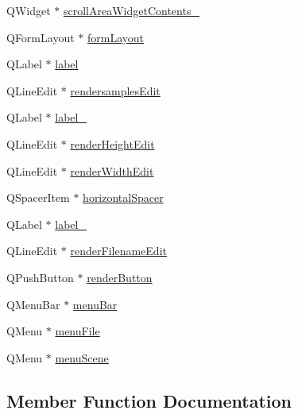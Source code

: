 \begin{DoxyCompactItemize}
Q\+Widget $\ast$ \hyperlink{classUi__MainWindow_a4e1eee0f921cc380d939163bfd5d47a3}{scroll\+Area\+Widget\+Contents\+\_}
\item 
Q\+Form\+Layout $\ast$ \hyperlink{classUi__MainWindow_afedcce3d8f3dddf4c1fd5b768660b8ee}{form\+Layout}
\item 
Q\+Label $\ast$ \hyperlink{classUi__MainWindow_ad9c89133780f28e6efa2ec17ceb9cff5}{label}
\item 
Q\+Line\+Edit $\ast$ \hyperlink{classUi__MainWindow_a4f6e5de43d5ec53629f8b24c8c04ccd4}{rendersamples\+Edit}
\item 
Q\+Label $\ast$ \hyperlink{classUi__MainWindow_a2e2516d755e4dd53fc905dabddf2738a}{label\+\_}
\item 
Q\+Line\+Edit $\ast$ \hyperlink{classUi__MainWindow_a175311edee055dc152229c85aa44aae2}{render\+Height\+Edit}
\item 
Q\+Line\+Edit $\ast$ \hyperlink{classUi__MainWindow_a03d97723a5fc40990e51477c727ef4ba}{render\+Width\+Edit}
\item 
Q\+Spacer\+Item $\ast$ \hyperlink{classUi__MainWindow_a7871ea8c4b6c595d7ccd53960b344719}{horizontal\+Spacer}
\item 
Q\+Label $\ast$ \hyperlink{classUi__MainWindow_a0376fd90247280e7c7957cc70628708c}{label\+\_}
\item 
Q\+Line\+Edit $\ast$ \hyperlink{classUi__MainWindow_af45b78bb37d033005794431a1ebb98a8}{render\+Filename\+Edit}
\item 
Q\+Push\+Button $\ast$ \hyperlink{classUi__MainWindow_a8ab000931129e9c9b0fb0f3d813cc704}{render\+Button}
\item 
Q\+Menu\+Bar $\ast$ \hyperlink{classUi__MainWindow_a2be1c24ec9adfca18e1dcc951931457f}{menu\+Bar}
\item 
Q\+Menu $\ast$ \hyperlink{classUi__MainWindow_a7ba84cb4cdd6a12dc83bf4e100bd8d80}{menu\+File}
\item 
Q\+Menu $\ast$ \hyperlink{classUi__MainWindow_a16e36cf51adc60f6bf8122c86d1c6b9d}{menu\+Scene}
\end{DoxyCompactItemize}


\subsection{Member Function Documentation}
\hypertarget{classUi__MainWindow_a097dd160c3534a204904cb374412c618}{}
